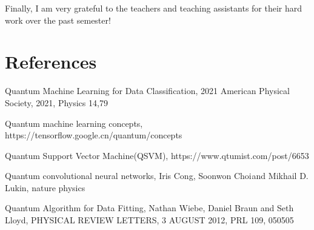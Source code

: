 \documentclass[11pt]{article}
\begin{document}
Finally, I am very grateful to the teachers and teaching assistants for their hard work over the past semester!

\section{References}

\noindent[1] Quantum Machine Learning for Data Classification, 2021 American Physical Society, 2021, Physics 14,79

\noindent[2] Quantum machine learning concepts, https://tensorflow.google.cn/quantum/concepts

\noindent[3] Quantum Support Vector Machine(QSVM), https://www.qtumist.com/post/6653

\noindent[4] Quantum convolutional neural networks, Iris Cong, Soonwon Choi and Mikhail D. Lukin, nature physics

\noindent[5] Quantum Algorithm for Data Fitting, Nathan Wiebe, Daniel Braun and Seth Lloyd, PHYSICAL REVIEW LETTERS, 3 AUGUST 2012, PRL 109, 050505
\end{document}

